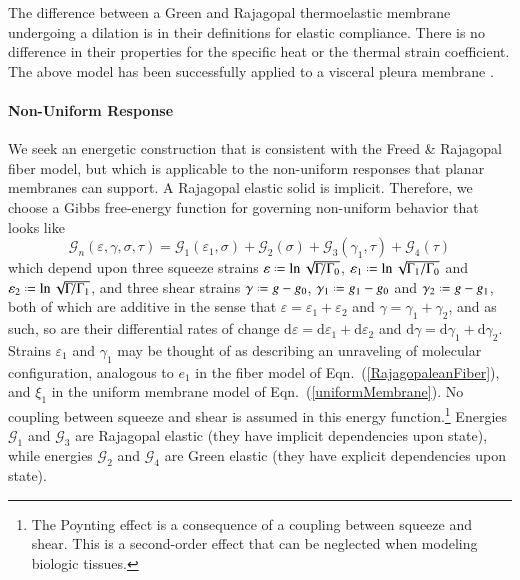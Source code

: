 The difference between a Green and Rajagopal thermo\-elastic membrane under\-going a dilation is in their definitions for elastic compliance.  There is no difference in their properties for the specific heat or the thermal strain coefficient.  The above model has been successfully applied to a visceral pleura membrane \cite{Freedetal17}.

\paragraph{Non-Uniform Response}

We seek an energetic construction that is consistent with the Freed \& Rajagopal \cite{FreedRajagopal16} fiber model, but which is applicable to the non-uniform responses that planar membranes can support.  A Rajagopal elastic solid is implicit. Therefore, we choose a Gibbs free-energy function for governing non-uniform behavior that looks like
\begin{equation}
\mathcal{G}_n ( \varepsilon , \gamma , \sigma , \tau ) = \mathcal{G}_1 ( \varepsilon_1 , \sigma ) + \mathcal{G}_2 ( \sigma ) + \mathcal{G}_3 ( \gamma_1 , \tau ) + \mathcal{G}_4 ( \tau )
\label{nonuniformEnergy}
\end{equation}
which depend upon three squeeze strains $\varepsilon \defeq \ln \sqrt{\Gamma \! / \Gamma_0}$, $\varepsilon_1 \defeq \ln \sqrt{ \Gamma_1 / \Gamma_0}$ and $\varepsilon_2 \defeq \ln \sqrt{ \Gamma \! / \Gamma_1}$, and three shear strains $\gamma \defeq g - g_0$, $\gamma_1 \defeq g_1 - g_0$ and $\gamma_2 \defeq g - g_1$, both of which are additive in the sense that $\varepsilon = \varepsilon_1 + \varepsilon_2$ and $\gamma = \gamma_1 + \gamma_2$, and as such, so are their differential rates of change $\mathrm{d} \varepsilon = \mathrm{d} \varepsilon_1 + \mathrm{d} \varepsilon_2$ and $\mathrm{d} \gamma = \mathrm{d} \gamma_1 + \mathrm{d} \gamma_2$.  Strains $\varepsilon_1$ and $\gamma_1$ may be thought of as describing an unraveling of molecular configuration, analogous to $e_1$ in the fiber model of Eqn.~(\ref{RajagopaleanFiber}), and $\xi_1$ in the uniform membrane model of Eqn.~(\ref{uniformMembrane}).  No coupling between squeeze and shear is assumed in this energy function.\footnote{
    The Poynting effect is a consequence of a coupling between squeeze and shear. \cite{FreedZamani19}  This is a second-order effect that can be neglected when modeling biologic tissues.
}  
Energies $\mathcal{G}_1$ and $\mathcal{G}_3$ are Rajagopal elastic (they have implicit dependencies upon state), while energies $\mathcal{G}_2$ and $\mathcal{G}_4$ are Green elastic (they have explicit dependencies upon state).

